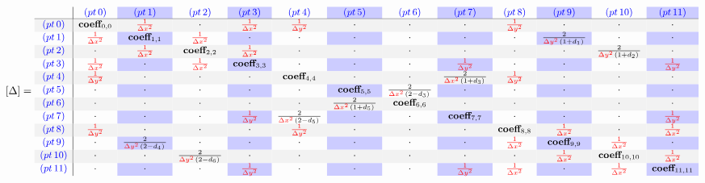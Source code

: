 \documentclass[10pt,a4paper, landscape]{article}
\newcommand{\pnormal}[1]{\textcolor{blue}{(pt\,#1)}}
\newcommand{\pgray}[1]{\rowcolor{gray!10}\textcolor{blue}{(pt\,#1)}}
\newcommand{\coeff}[3]{\frac{2}{\textcolor{red}{#1}\,#2\,#3}}
\newcommand{\dx}{\Delta x}
\newcommand{\dy}{\Delta y}
\renewcommand{\b}{\textcolor{red}{\frac{1}{\dx^2}}}
\renewcommand{\c}{\textcolor{red}{\frac{1}{\dy^2}}}
\begin{document}
\begin{equation*}
\small
[\Delta] = 
\begin{array}{c|c>{\columncolor{blue!20}}cc>{\columncolor{blue!20}}cc>{\columncolor{blue!20}}cc>{\columncolor{blue!20}}cc>{\columncolor{blue!20}}cc>{\columncolor{blue!20}}c}
& \pnormal{0} & \pnormal{1} & \pnormal{2} & \pnormal{3} & \pnormal{4} & \pnormal{5} & \pnormal{6} & \pnormal{7} & \pnormal{8} & \pnormal{9} & \pnormal{10} & \pnormal{11} \\
\hline
\pgray{0} & \textbf{coeff}_{0,0} & \b & \cdot & \b & \c & \cdot & \cdot & \cdot & \c & \cdot & \cdot & \cdot\\
\pnormal{1} & \b & \textbf{coeff}_{1,1} & \b & \cdot & \cdot & \cdot & \cdot & \cdot & \cdot & \coeff{\dy^2}{(1+d_1)}{}  & \cdot & \cdot\\
\pgray{2} & \cdot & \b & \textbf{coeff}_{2,2} & \b & \cdot & \cdot & \cdot & \cdot & \cdot & \cdot & \coeff{\dy^2}{(1+d_2)}{} & \cdot\\
\pnormal{3} & \b & \cdot & \b & \textbf{coeff}_{3,3} & \cdot & \cdot & \cdot & \c & \cdot & \cdot & \cdot & \c\\
\pgray{4} & \c & \cdot & \cdot & \cdot & \textbf{coeff}_{4,4} & \cdot & \cdot & \coeff{\dx^2}{(1+d_3)}{} & \c & \cdot & \cdot & \cdot\\
\pnormal{5} & \cdot & \cdot & \cdot & \cdot & \cdot & \textbf{coeff}_{5,5} & \coeff{\dx^2}{(2-d_3)}{} & \cdot & \cdot & \cdot & \cdot & \cdot\\
\pgray{6} & \cdot & \cdot & \cdot & \cdot & \cdot & \coeff{\dx^2}{(1+d_5)}{} & \textbf{coeff}_{6,6} & \cdot & \cdot & \cdot & \cdot & \cdot \\
\pnormal{7} & \cdot & \cdot & \cdot & \c & \coeff{\dx^2}{(2-d_5)}{} & \cdot & \cdot & \textbf{coeff}_{7,7} & \cdot & \cdot & \cdot & \c \\
\pgray{8} & \c & \cdot & \cdot & \cdot & \c & \cdot & \cdot & \cdot & \textbf{coeff}_{8,8} & \b & \cdot & \b\\
\pnormal{9} & \cdot & \coeff{\dy^2}{(2-d_4)}{} & \cdot & \cdot & \cdot & \cdot & \cdot & \cdot & \b & \textbf{coeff}_{9,9} & \b & \cdot\\
\pgray{10} & \cdot & \cdot & \coeff{\dy^2}{(2-d_6)}{} & \cdot & \cdot & \cdot & \cdot & \cdot & \cdot & \b & \textbf{coeff}_{10,10} & \b\\
\pnormal{11} & \cdot & \cdot & \cdot & \c & \cdot & \cdot & \cdot & \c & \b & \cdot & \b & \textbf{coeff}_{11,11}\\
\end{array}
\end{equation*}
\end{document}
